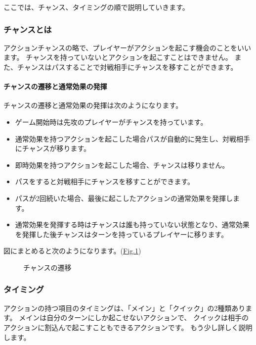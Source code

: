 \documentclass[letterpaper,10pt,dvipdfmx]{sphinxmanual}
\begin{document}
ここでは、チャンス、タイミングの順で説明していきます。


\subsubsection{チャンスとは}
\label{\detokenize{common/03-action:id19}}
アクションチャンスの略で、プレイヤーがアクションを起こす機会のことをいいます。
チャンスを持っていないとアクションを起こすことはできません。
また、チャンスはパスすることで対戦相手にチャンスを移すことができます。


\paragraph{チャンスの遷移と通常効果の発揮}
\label{\detokenize{common/03-action:id20}}
チャンスの遷移と通常効果の発揮は次のようになります。
\begin{itemize}
\item {} 
ゲーム開始時は先攻のプレイヤーがチャンスを持っています。

\item {} 
通常効果を持つアクションを起こした場合パスが自動的に発生し、対戦相手にチャンスが移ります。

\item {} 
即時効果を持つアクションを起こした場合、チャンスは移りません。

\item {} 
パスをすると対戦相手にチャンスを移すことができます。

\item {} 
パスが2回続いた場合、最後に起こしたアクションの通常効果を発揮します。

\item {} 
通常効果を発揮する時はチャンスは誰も持っていない状態となり、通常効果を発揮した後チャンスはターンを持っているプレイヤーに移ります。

\end{itemize}

図にまとめると次のようになります。(\hyperref[\detokenize{common/03-action:chance}]{Fig.\@ \ref{\detokenize{common/03-action:chance}}})

\begin{figure}[htbp]
\centering
\capstart

\noindent{}
\caption{チャンスの遷移}\label{\detokenize{common/03-action:id35}}\label{\detokenize{common/03-action:chance}}\end{figure}


\subsubsection{タイミング}
\label{\detokenize{common/03-action:id21}}
アクションの持つ項目のタイミングは、「メイン」と「クイック」の2種類あります。
メインは自分のターンにしか起こせないアクションで、
クイックは相手のアクションに割込んで起こすこともできるアクションです。
もう少し詳しく説明します。
\end{document}
